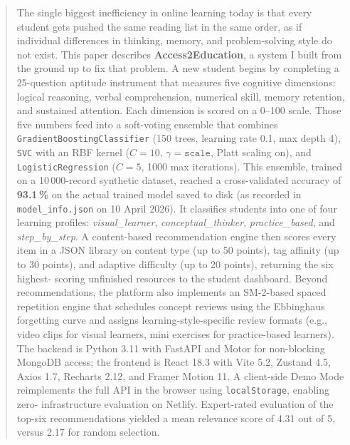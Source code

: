 \documentclass[12pt,a4paper]{article}
\begin{document}
\begin{abstract}
\noindent
The single biggest inefficiency in online learning today is that
every student gets pushed the same reading list in the same order,
as if individual differences in thinking, memory, and problem-solving
style do not exist. This paper describes \textbf{Access2Education},
a system I built from the ground up to fix that problem. A new
student begins by completing a 25-question aptitude instrument that
measures five cognitive dimensions: logical reasoning, verbal
comprehension, numerical skill, memory retention, and sustained
attention. Each dimension is scored on a 0--100 scale. Those five
numbers feed into a soft-voting ensemble that combines
\texttt{GradientBoostingClassifier} (150 trees, learning rate 0.1,
max depth 4), \texttt{SVC} with an RBF kernel ($C=10$,
$\gamma=\texttt{scale}$, Platt scaling on), and
\texttt{LogisticRegression} ($C=5$, 1000 max iterations). This
ensemble, trained on a 10\,000-record synthetic dataset, reached a
cross-validated accuracy of \textbf{93.1\,\%} on the actual trained
model saved to disk (as recorded in \texttt{model\_info.json} on
10 April 2026). It classifies students into one of four learning
profiles: \emph{visual\_learner}, \emph{conceptual\_thinker},
\emph{practice\_based}, and \emph{step\_by\_step}. A content-based
recommendation engine then scores every item in a JSON library on
content type (up to 50 points), tag affinity (up to 30 points), and
adaptive difficulty (up to 20 points), returning the six highest-
scoring unfinished resources to the student dashboard. Beyond
recommendations, the platform also implements an SM-2-based spaced
repetition engine that schedules concept reviews using the
Ebbinghaus forgetting curve and assigns learning-style-specific
review formats (e.g., video clips for visual learners, mini exercises
for practice-based learners). The backend is Python 3.11 with
FastAPI and Motor for non-blocking MongoDB access; the frontend is
React 18.3 with Vite 5.2, Zustand 4.5, Axios 1.7, Recharts 2.12,
and Framer Motion 11. A client-side Demo Mode reimplements the full
API in the browser using \texttt{localStorage}, enabling zero-
infrastructure evaluation on Netlify. Expert-rated evaluation of the
top-six recommendations yielded a mean relevance score of 4.31 out of
5, versus 2.17 for random selection.
\end{abstract}
\end{document}
